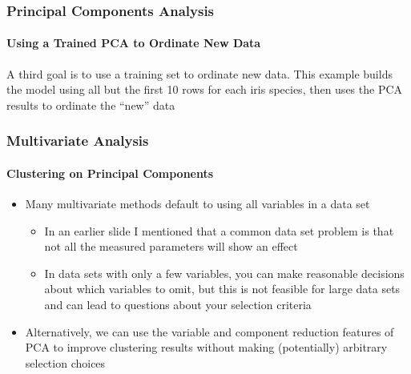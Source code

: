 \documentclass[10pt]{beamer}
\newcommand{\bi}{\begin{itemize}}
\newcommand{\ei}{\end{itemize}}
\newcommand{\iwsframe}[2]{
\begin{frame}[fragile]
\frametitle{#1}
\framesubtitle{#2}
}
\begin{document}
\iwsframe{Principal Components Analysis}{Using a Trained PCA to Ordinate New Data}
\begin{center}
\end{center}

\vspace*{-3ex} {\scriptsize A third goal is to use a training set to
  ordinate new data.  This example builds the model using all but the
  first 10 rows for each iris species, then uses the PCA results to ordinate the ``new'' data\\ }
\end{frame}


\iwsframe{Multivariate Analysis}{Clustering on Principal Components}

\begin{itemize}
\item Many multivariate methods default to using all variables in a data set

  \bi
  \item In an earlier slide I mentioned that a common data set problem
    is that not all the measured parameters will show an effect
  \item In data sets with only a few variables, you can make reasonable
    decisions about which variables to omit, but this is not feasible
    for large data sets and can lead to questions about your selection
    criteria \ei
    
\item Alternatively, we can use the variable and component reduction features of PCA to improve
  clustering results without making (potentially) arbitrary selection choices
\end{itemize}
\end{frame}
\end{document}
